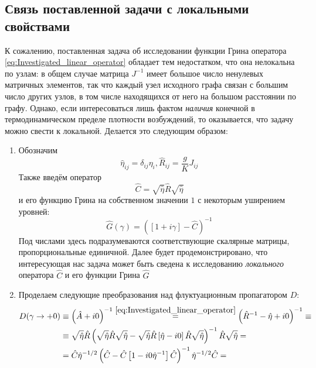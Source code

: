 \subsection{Связь поставленной задачи с локальными свойствами}
К сожалению, поставленная задача об исследовании функции Грина оператора \eqref{eq:Investigated_linear_operator} обладает тем недостатком, что она нелокальна по узлам: в общем случае матрица $J^{-1}$ имеет большое число ненулевых матричных элементов, так что каждый узел исходного графа связан с большим число других узлов, в том числе находящихся от него на большом расстоянии по графу. Однако, если интересоваться лишь фактом \textit{наличия} конечной в термодинамическом пределе плотности возбуждений, то оказывается, что задачу можно свести к локальной. Делается это следующим образом:
\begin{enumerate}
	\item Обозначим
	$$
	\hat{\eta}_{ij} = \delta_{ij} \eta_i, \hat{R}_{ij} = \frac{g}{K} J_{ij}
	$$
	Также введём оператор
	\begin{equation}
		\label{eq:Local_operator_definition}
		\hat{C} = \sqrt{\hat{\eta}} \hat{R} \sqrt{\hat{\eta}}
	\end{equation}
	и его функцию Грина на собственном значении $1$ с некоторым уширением уровней:
	\begin{equation}
		\label{eq:Local_operator_Green_function_definition}
		\hat{G}(\gamma) = \left( \left[ 1 + i \gamma \right] - \hat{C} \right)^{-1} 
	\end{equation}
	Под числами здесь подразумеваются соответствующие скалярные матрицы, пропорциональные единичной.
	Далее будет продемонстрировано, что интересующая нас задача может быть сведена к исследованию \textit{локального} оператора $\hat{C}$ и его функции Грина $\hat{G}$
	\item Проделаем следующие преобразования над флуктуационным пропагатором $D$:
	\begin{equation}
		\label{eq:Connection_between_GF}
		\begin{split}
			D(\gamma \rightarrow +0) & \equiv \left( \hat{A} + i 0 \right)^{-1} \overset{\eqref{eq:Investigated_linear_operator}}{=} \left( \hat{R}^{-1} - \hat{\eta} + i 0 \right)^{-1} \equiv \\
			& \equiv \sqrt{\hat{\eta}} \hat{R}  \left( \sqrt{\hat{\eta}} \hat{R} \sqrt{\hat{\eta}} - \sqrt{\hat{\eta}} \hat{R} \left[ \hat{\eta} - i 0 \right] \hat{R} \sqrt{\hat{\eta}} \right)^{-1} \hat{R} \sqrt{\hat{\eta}} = \\
			& = \hat{C} \hat{\eta}^{-1/2} \left( \hat{C} - \hat{C}\left[1 - i 0 \hat{\eta}^{-1} \right] \hat{C} \right)^{-1} \hat{\eta}^{-1/2} \hat{C} = \\

\end{split}
\end{equation}
\end{enumerate}
